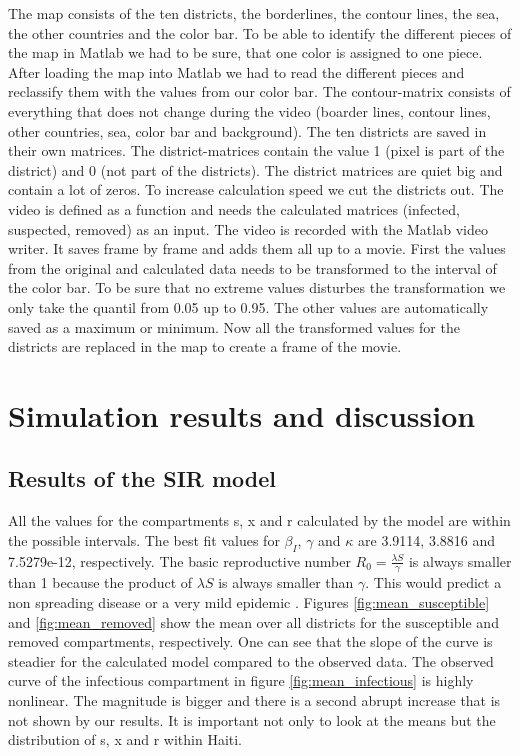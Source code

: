 \documentclass[11pt]{article}
\begin{document}
The map consists of the ten districts, the borderlines, the contour lines, the sea, the other countries and the color bar. To be able to identify the different pieces of the map in Matlab we had to be sure, that one color is assigned to one piece. After loading the map into Matlab we had to read the different pieces and reclassify them with the values from our color bar. The contour-matrix consists of everything that does not change during the video (boarder lines, contour lines, other countries, sea, color bar and background). The ten districts are saved in their own matrices. The district-matrices contain the value 1 (pixel is part of the district) and 0 (not part of the districts). The district matrices are quiet big and contain a lot of zeros. To increase calculation speed we cut the districts out. The video is defined as a function and needs the calculated matrices (infected, suspected, removed) as an input. The video is recorded with the Matlab video writer. It saves frame by frame and adds them all up to a movie. First the values from the original and calculated data needs to be transformed to the interval of the color bar. To be sure that no extreme values disturbes the transformation we only take the quantil from 0.05 up to 0.95. The other values are automatically saved as a maximum or minimum. Now all the transformed values for the districts are replaced in the map to create a frame of the movie.













\newpage
\section{Simulation results and discussion}
\subsection{Results of the SIR model}
All the values for the compartments s, x and r calculated by the model are within the possible intervals. The best fit values for $\beta_{I}$, $\gamma$ and $\kappa$ are 3.9114, 3.8816 and 7.5279e-12, respectively. The basic reproductive number $R_{0} = \frac{\lambda S}{\gamma}$ is always smaller than 1 because the product of $\lambda S$ is always smaller than $\gamma$. This would predict a non spreading disease or a very mild epidemic \cite{kermack:1927}. Figures \ref{fig:mean_susceptible} and \ref{fig:mean_removed} show the mean over all districts for the susceptible and removed compartments, respectively. One can see that the slope of the curve is steadier for the calculated model compared to the observed data. The observed curve of the infectious compartment in figure \ref{fig:mean_infectious} is highly nonlinear. The magnitude is bigger and there is a second abrupt increase that is not shown by our results. It is important not only to look at the means but the distribution of s, x and r within Haiti.\\
\end{document}
